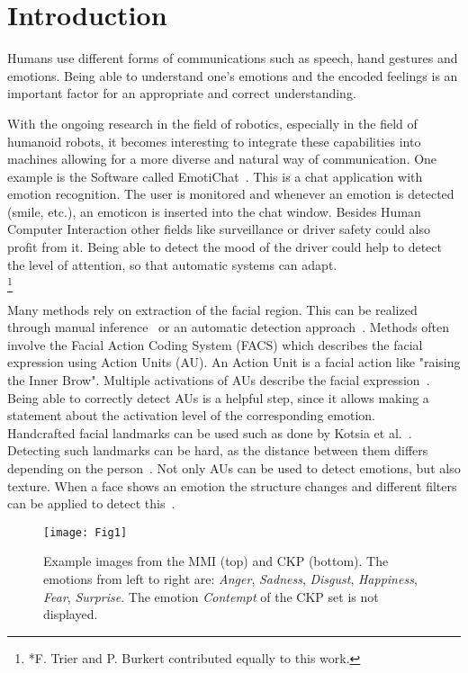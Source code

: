 \documentclass[10pt,journal,compsoc, hidelinks]{IEEEtran}
\begin{document}
\section{Introduction}

Humans use different forms of communications such as speech, hand gestures and emotions. Being able to understand one's emotions and the encoded feelings is an important factor for an appropriate and correct understanding.


With the ongoing research in the field of robotics, especially in the field of humanoid robots, it becomes interesting to integrate these capabilities into machines allowing for a more diverse and natural way of communication. One example is the Software called EmotiChat~\cite{Anderson06areal-time}. This is a chat application with emotion recognition. The user is monitored and whenever an emotion is detected (smile, etc.), an emoticon is inserted into the chat window. Besides Human Computer Interaction other fields like surveillance or driver safety could also profit from it. Being able to detect the mood of the driver could help to detect the level of attention, so that automatic systems can adapt.\\
\let\thefootnote\relax\footnote{*F. Trier and P. Burkert contributed equally to this work.}


Many methods rely on extraction of the facial region. This can be realized through manual inference~\cite{4032815} or an automatic detection approach~\cite{Anderson06areal-time}.
Methods often involve the Facial Action Coding System (FACS) which describes the facial expression using Action Units (AU). An Action Unit is a facial action like "raising the Inner Brow". Multiple activations of AUs describe the facial expression~\cite{kumar2009face}. Being able to correctly detect AUs is a helpful step, since it allows making a statement about the activation level of the corresponding emotion. \\
Handcrafted facial landmarks can be used such as done by Kotsia et al.~\cite{4032815}. Detecting such landmarks can be hard, as the distance between them differs depending on the person~\cite{6998925}. Not only AUs can be used to detect emotions, but also texture. When a face shows an emotion the structure changes and different filters can be applied to detect this~\cite{6998925}.\\


\begin{figure}
   \centering
        \texttt{[image: Fig1]}
   \caption{Example images from the MMI (top) and CKP (bottom). The emotions from left to right are: \textit{Anger}, \textit{Sadness}, \textit{Disgust}, \textit{Happiness}, \textit{Fear}, \textit{Surprise}. The emotion \textit{Contempt} of the CKP set is not displayed.}\label{fig:example_images}
\end{figure}
\end{document}
